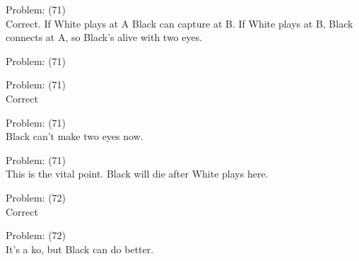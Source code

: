 \documentclass[11pt]{article}
\begin{document}
\begin{minipage}[t]{0.5\textwidth}
  {\centering
  
Problem: (71)\\
Correct. If White plays at A Black can capture at B. If White plays at B, Black connects at A, so Black's alive with two eyes.\\
  }
\end{minipage}
\begin{minipage}[t]{0.5\textwidth}
  {\centering
  
Problem: (71)\\
  }
\end{minipage}
\begin{minipage}[t]{0.5\textwidth}
  {\centering
  
Problem: (71)\\
Correct\\
  }
\end{minipage}
\begin{minipage}[t]{0.5\textwidth}
  {\centering
  
Problem: (71)\\
Black can't make two eyes now.\\
  }
\end{minipage}
\begin{minipage}[t]{0.5\textwidth}
  {\centering
  
Problem: (71)\\
This is the vital point. Black will die after White plays here.\\
  }
\end{minipage}
\begin{minipage}[t]{0.5\textwidth}
  {\centering
  
Problem: (72)\\
Correct\\
  }
\end{minipage}
\begin{minipage}[t]{0.5\textwidth}
  {\centering
  
Problem: (72)\\
It's a ko, but Black can do better.\\
  }
\end{minipage}
\end{document}
